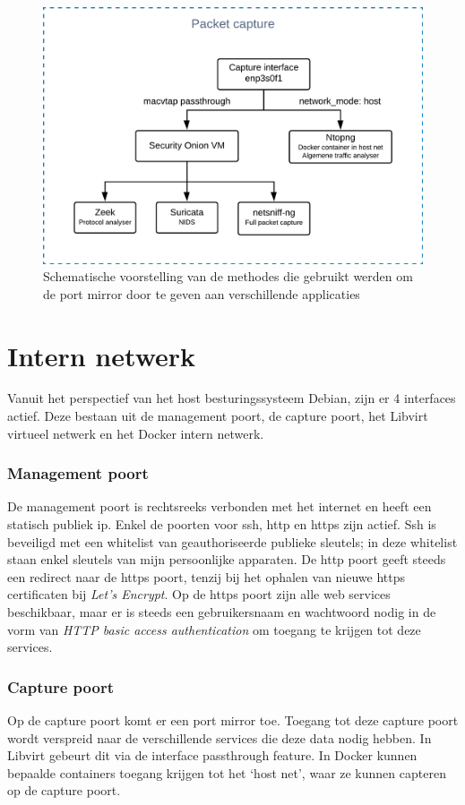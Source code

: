 \documentclass[a4paper, 12pt]{report}
\begin{document}
\begin{figure}[H]
  \centering
  \includegraphics[width=\textwidth]{aangepast-systeem-schema-pcap}
  \caption{Schematische voorstelling van de methodes die gebruikt werden om de port mirror door te geven aan verschillende applicaties}
  \label{fig:aangepast-systeem-schema-pcap}
\end{figure}

\section{Intern netwerk}
Vanuit het perspectief van het host besturingssysteem Debian, zijn er 4 interfaces actief.
Deze bestaan uit de management poort, de capture poort, het Libvirt virtueel netwerk en het Docker intern netwerk.

\subsubsection{Management poort}
De management poort is rechtsreeks verbonden met het internet en heeft een statisch publiek ip.
Enkel de poorten voor ssh, http en https zijn actief.
Ssh is beveiligd met een whitelist van geauthoriseerde publieke sleutels; in deze whitelist staan enkel sleutels van mijn persoonlijke apparaten.
De http poort geeft steeds een redirect naar de https poort, tenzij bij het ophalen van nieuwe https certificaten bij \emph{Let's Encrypt}.
Op de https poort zijn alle web services beschikbaar, maar er is steeds een gebruikersnaam en wachtwoord nodig in de vorm van \emph{HTTP basic access authentication} om toegang te krijgen tot deze services.

\subsubsection{Capture poort}
Op de capture poort komt er een port mirror toe.
Toegang tot deze capture poort wordt verspreid naar de verschillende services die deze data nodig hebben.
In Libvirt gebeurt dit via de interface passthrough feature.
In Docker kunnen bepaalde containers toegang krijgen tot het `host net', waar ze kunnen capteren op de capture poort.
\end{document}
